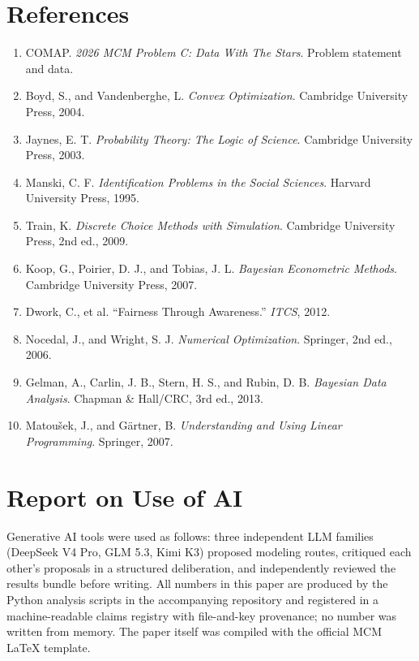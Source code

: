 \documentclass[12pt]{article}
\begin{document}
\section*{References}
\begin{enumerate}
\item COMAP. \emph{2026 MCM Problem C: Data With The Stars}. Problem statement and data.
\item Boyd, S., and Vandenberghe, L. \emph{Convex Optimization}. Cambridge University Press, 2004.
\item Jaynes, E. T. \emph{Probability Theory: The Logic of Science}. Cambridge University Press, 2003.
\item Manski, C. F. \emph{Identification Problems in the Social Sciences}. Harvard University Press, 1995.
\item Train, K. \emph{Discrete Choice Methods with Simulation}. Cambridge University Press, 2nd ed., 2009.
\item Koop, G., Poirier, D. J., and Tobias, J. L. \emph{Bayesian Econometric Methods}. Cambridge University Press, 2007.
\item Dwork, C., et al. ``Fairness Through Awareness.'' \emph{ITCS}, 2012.
\item Nocedal, J., and Wright, S. J. \emph{Numerical Optimization}. Springer, 2nd ed., 2006.
\item Gelman, A., Carlin, J. B., Stern, H. S., and Rubin, D. B. \emph{Bayesian Data Analysis}. Chapman \& Hall/CRC, 3rd ed., 2013.
\item Matou\v{s}ek, J., and G\"artner, B. \emph{Understanding and Using Linear Programming}. Springer, 2007.
\end{enumerate}

\section*{Report on Use of AI}
Generative AI tools were used as follows: three independent LLM families
(DeepSeek V4 Pro, GLM 5.3, Kimi K3) proposed modeling routes, critiqued each other's
proposals in a structured deliberation, and independently reviewed the results
bundle before writing. All numbers in this paper are produced by the Python
analysis scripts in the accompanying repository and registered in a machine-readable
claims registry with file-and-key provenance; no number was written from memory.
The paper itself was compiled with the official MCM LaTeX template.

\end{document}

